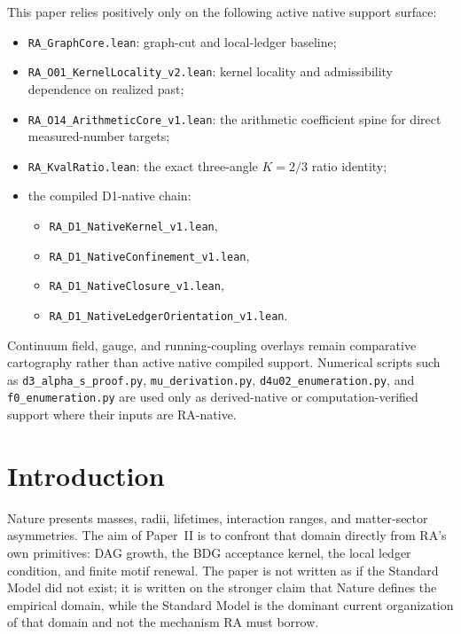 \documentclass[11pt]{article}
\begin{document}
\begin{tcolorbox}[title=Active Native Support Surface Used Positively,colback=gray!5,colframe=gray!60]
This paper relies positively only on the following active native support surface:
\begin{itemize}[nosep]
    \item \texttt{RA\_GraphCore.lean}: graph-cut and local-ledger baseline;
    \item \texttt{RA\_O01\_KernelLocality\_v2.lean}: kernel locality and admissibility dependence on realized past;
    \item \texttt{RA\_O14\_ArithmeticCore\_v1.lean}: the arithmetic coefficient spine for direct measured-number targets;
    \item \texttt{RA\_KvalRatio.lean}: the exact three-angle $K=2/3$ ratio identity;
    \item the compiled D1-native chain:
    \begin{itemize}[nosep]
        \item \texttt{RA\_D1\_NativeKernel\_v1.lean},
        \item \texttt{RA\_D1\_NativeConfinement\_v1.lean},
        \item \texttt{RA\_D1\_NativeClosure\_v1.lean},
        \item \texttt{RA\_D1\_NativeLedgerOrientation\_v1.lean}.
    \end{itemize}
\end{itemize}
Continuum field, gauge, and running-coupling overlays remain comparative cartography rather than active native compiled support. Numerical scripts such as \texttt{d3\_alpha\_s\_proof.py}, \texttt{mu\_derivation.py}, \texttt{d4u02\_enumeration.py}, and \texttt{f0\_enumeration.py} are used only as derived-native or computation-verified support where their inputs are RA-native.
\end{tcolorbox}


\section{Introduction}

Nature presents masses, radii, lifetimes, interaction ranges, and matter-sector asymmetries. The aim of Paper~II is to confront that domain directly from RA's own primitives: DAG growth, the BDG acceptance kernel, the local ledger condition, and finite motif renewal. The paper is not written as if the Standard Model did not exist; it is written on the stronger claim that Nature defines the empirical domain, while the Standard Model is the dominant current organization of that domain and not the mechanism RA must borrow.
\end{document}
